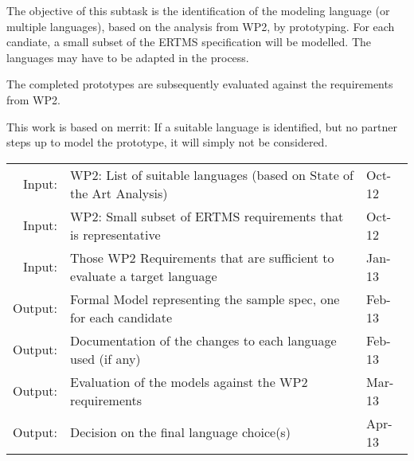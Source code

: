 \documentclass[11pt, a4paper]{article}
\let\oldmarginpar\marginpar
\renewcommand\marginpar[1]{\-\oldmarginpar[\raggedleft\scriptsize #1]%
{\raggedright\scriptsize #1}}
\newenvironment{inoutput}
{\vspace{2mm}
\noindent
\begin{tabular}{|r|p{.7\linewidth}|l|}
\hline}
{
\hline
\end{tabular}}
\begin{document}
The objective of this subtask is the identification of the modeling language (or multiple languages), based on the analysis from WP2, by prototyping.  For each candiate, a small subset of the ERTMS specification will be modelled.  The languages may have to be adapted in the process.

The completed prototypes are subsequently evaluated against the requirements from WP2.

This work is based on merrit: If a suitable language is identified, but no partner steps up to model the prototype, it will simply not be considered.




\begin{inoutput}
Input: & WP2: List of suitable languages (based on State of the Art Analysis) & Oct-12 \\
Input: & WP2: Small subset of ERTMS requirements that is representative & Oct-12 \\
Input: & Those WP2 Requirements that are sufficient to evaluate a target language & Jan-13 \\
\hline
Output: & Formal Model representing the sample spec, one for each candidate & Feb-13 \\
Output: & Documentation of the changes to each language used (if any) & Feb-13 \\
Output: & Evaluation of the models against the WP2 requirements & Mar-13 \\
Output: & Decision on the final language choice(s) & Apr-13 \\
\end{inoutput}
\end{document}
